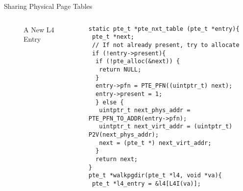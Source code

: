 \documentclass[aspectratio=169,xcolor=dvipsnames]{beamer}
\begin{document}
\begin{frame}[fragile]{Sharing Physical Page Tables}
\begin{columns}[c]
\begin{figure}
\begin{tikzpicture}[x=0.75pt,y=0.75pt,yscale=-0.5,xscale=0.5]
\end{tikzpicture}
        \caption{A New L4 Entry}
        \label{fig:enter-label}
    \end{figure}
\begin{lstlisting}[style=CStyleNum, basicstyle=\tiny]
static pte_t *pte_nxt_table (pte_t *entry){
 pte_t *next;
 // If not already present, try to allocate
 if (!entry->present){
  if (!pte_alloc(&next)) {
   return NULL;
  }
  entry->pfn = PTE_PFN((uintptr_t) next);
  entry->present = 1;
  } else {
   uintptr_t next_phys_addr = PTE_PFN_TO_ADDR(entry->pfn);        
   uintptr_t next_virt_addr = (uintptr_t) P2V(next_phys_addr);
   next = (pte_t *) next_virt_addr;
  }
  return next;
}   
pte_t *walkpgdir(pte_t *l4, void *va){ 
 pte_t *l4_entry = &l4[L4I(va)];
\end{lstlisting}
\end{columns}
\end{frame}
\end{document}
